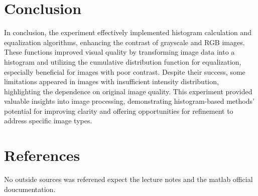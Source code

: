 \documentclass[a4paper,11pt]{article}
\begin{document}
\section{Conclusion}
In conclusion, the experiment effectively implemented histogram calculation and equalization algorithms, enhancing the contrast of grayscale and RGB images. These functions improved visual quality by transforming image data into a histogram and utilizing the cumulative distribution function for equalization, especially beneficial for images with poor contrast. Despite their success, some limitations appeared in images with insufficient intensity distribution, highlighting the dependence on original image quality. This experiment provided valuable insights into image processing, demonstrating histogram-based methods' potential for improving clarity and offering opportunities for refinement to address specific image types.

\section{References}
No outside sources was referened expect the lecture notes and the matlab official doucumentation.
\end{document}
